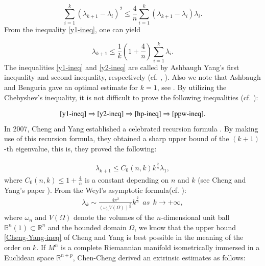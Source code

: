 \documentclass[12pt]{article}
\numberwithin{equation}{section}
\begin{document}
\begin{equation}\label{y1-ineq}\sum^{k}_{i=1}(\lambda_{k+1}-\lambda_{i})^{2}\leq\frac{4}{n}\sum^{k}_{i=1}(\lambda_{k+1}-\lambda_{i})\lambda_{i}.\end{equation}
From the inequality \eqref{y1-ineq}, one can yield

\begin{equation}\label{y2-ineq}\lambda_{k+1}\leq\frac{1}{k}\left(1+\frac{4}{n}\right)\sum^{k}_{i=1}\lambda_{i}.\end{equation}
The inequalities \eqref{y1-ineq} and \eqref{y2-ineq} are called by Ashbaugh Yang's first inequality and second inequality,
respectively (cf. \cite{Ash8}, \cite{Ash9}). Also we note that Ashbaugh and Benguria gave an optimal
estimate for $k = 1$, see \cite{ Ash2,Ash3,Ash4}. By utilizing the Chebyshev's inequality, it is not difficult
to prove the following inequalities (cf. \cite{Ash9}):


$$\eqref{y1-ineq}\Rightarrow \eqref{y2-ineq} \Rightarrow \eqref{hp-ineq} \Rightarrow \eqref{ppw-ineq}.$$
In 2007, Cheng and Yang established a celebrated recursion formula \cite{CY3}.  By making use of this recursion formula, they obtained a sharp upper bound
of the $(k+1)$-th eigenvalue, this is, they proved the following:

\begin{equation}
\begin{aligned}
\label{Cheng-Yang-ineq}\lambda_{k+1}
\leq C_{0}(n,k)k^{\frac{2}{n}}\lambda_{1},
\end{aligned}
\end{equation}
where $C_{0}(n,k)\leq1+\frac{4}{n}$ is a constant depending on $n$ and $k$ (see Cheng and Yang's paper \cite{CY3}). From the Weyl's
asymptotic formula(cf. \cite{Wey,Weyl1,Bera}):
\begin{equation}
\begin{aligned}
\label{Weyl-asmptotic-formula}\lambda_{k}\sim\frac{4\pi^{2}}{(\omega_{n}V(\Omega))^{\frac{2}{n}}}k^{\frac{2}{n}}\ \ as \ \ k\rightarrow+\infty,\end{aligned}
\end{equation}
where $\omega_{n}$ and $V(\Omega)$ denote the volumes of the $n$-dimensional unit ball $\mathbb{B}^{n}(1)\subset\mathbb{R}^{n}$ and the bounded domain $\Omega$, we know that the upper bound \eqref{Cheng-Yang-ineq} of Cheng and Yang is
best possible in the meaning of the order on $k$. If $M^{n}$ is a complete Riemannian manifold isometrically
immersed in a Euclidean space  $\mathbb{R}^{n+p}$, Chen-Cheng \cite{CC} derived an extrinsic estimates as follows:
\end{document}
